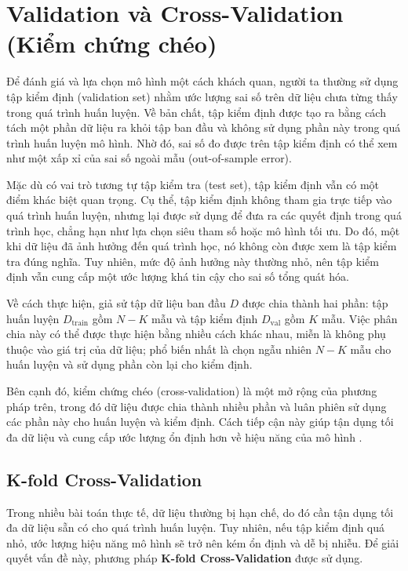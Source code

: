 \section{Validation và Cross-Validation (Kiểm chứng chéo)}

Để đánh giá và lựa chọn mô hình một cách khách quan, người ta thường sử dụng tập kiểm định (validation set) nhằm ước lượng sai số trên dữ liệu chưa từng thấy trong quá trình huấn luyện. Về bản chất, tập kiểm định được tạo ra bằng cách tách một phần dữ liệu ra khỏi tập ban đầu và không sử dụng phần này trong quá trình huấn luyện mô hình. Nhờ đó, sai số đo được trên tập kiểm định có thể xem như một xấp xỉ của sai số ngoài mẫu (out-of-sample error).

Mặc dù có vai trò tương tự tập kiểm tra (test set), tập kiểm định vẫn có một điểm khác biệt quan trọng. Cụ thể, tập kiểm định không tham gia trực tiếp vào quá trình huấn luyện, nhưng lại được sử dụng để đưa ra các quyết định trong quá trình học, chẳng hạn như lựa chọn siêu tham số hoặc mô hình tối ưu. Do đó, một khi dữ liệu đã ảnh hưởng đến quá trình học, nó không còn được xem là tập kiểm tra đúng nghĩa. Tuy nhiên, mức độ ảnh hưởng này thường nhỏ, nên tập kiểm định vẫn cung cấp một ước lượng khá tin cậy cho sai số tổng quát hóa.

Về cách thực hiện, giả sử tập dữ liệu ban đầu $D$ được chia thành hai phần: tập huấn luyện $D_{\text{train}}$ gồm $N-K$ mẫu và tập kiểm định $D_{\text{val}}$ gồm $K$ mẫu. Việc phân chia này có thể được thực hiện bằng nhiều cách khác nhau, miễn là không phụ thuộc vào giá trị của dữ liệu; phổ biến nhất là chọn ngẫu nhiên $N-K$ mẫu cho huấn luyện và sử dụng phần còn lại cho kiểm định.

Bên cạnh đó, kiểm chứng chéo (cross-validation) là một mở rộng của phương pháp trên, trong đó dữ liệu được chia thành nhiều phần và luân phiên sử dụng các phần này cho huấn luyện và kiểm định. Cách tiếp cận này giúp tận dụng tối đa dữ liệu và cung cấp ước lượng ổn định hơn về hiệu năng của mô hình \cite[p.~138]{AbuMostafa2012}.


\subsection{K-fold Cross-Validation}
Trong nhiều bài toán thực tế, dữ liệu thường bị hạn chế, do đó cần tận dụng tối đa dữ liệu sẵn có cho quá trình huấn luyện. Tuy nhiên, nếu tập kiểm định quá nhỏ, ước lượng hiệu năng mô hình sẽ trở nên kém ổn định và dễ bị nhiễu. Để giải quyết vấn đề này, phương pháp \textbf{K-fold Cross-Validation} được sử dụng.

